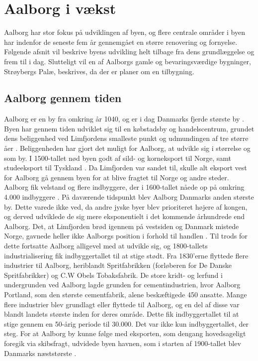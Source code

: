 \chapter{Aalborg i vækst}
Aalborg har stor fokus på udviklingen af byen, og flere centrale områder i byen har indenfor de seneste fem år gennemgået en større renovering og fornyelse. Følgende afsnit vil beskrive byens udvikling helt tilbage fra dens grundlæggelse og frem til i dag. Slutteligt vil en af Aalborgs gamle og bevaringsværdige bygninger, Strøybergs Palæ, beskrives, da der er planer om en tilbygning. 

\section{Aalborg gennem tiden}
Aalborg er en by fra omkring år 1040, og er i dag Danmarks fjerde største by \citep{Denstore}. Byen har gennem tiden udviklet sig til en købstadsby og handelscentrum, grundet dens beliggenhed ved Limfjordens smalleste punkt og udmundingen af tre større åer \citep{byhistorie}. Beliggenheden har gjort det muligt for Aalborg, at udvikle sig i størrelse og som by. I 1500-tallet nød byen godt af sild- og korneksport til Norge, samt studeeksport til Tyskland \citep{byhistorie}. Da Limfjorden var sandet til, skulle alt eksport vest for Aalborg gå gennem byen for at blive fragtet til Norge og andre steder. Aalborg fik velstand og flere indbyggere, der i 1600-tallet nåede op på omkring 4.000 indbyggere \citep{indbyggertal}. På daværende tidspunkt blev Aalborg Danmarks anden største by. Dette varede ikke ved, da andre jyske byer blev prioriteret højere af kongen, og derved udviklede de sig mere eksponentielt i det kommende århundrede end Aalborg. Det, at Limfjorden brød igennem på vestsiden og Danmark mistede Norge, gavnede heller ikke Aalborgs position i forhold til handlen \citep{indbyggertal}.
\newline \indent{     }  Til trods for dette fortsatte Aalborg alligevel med at udvikle sig, og 1800-tallets industrialisering fik indbyggertallet til at stige stødt. Fra 1830’erne flyttede flere industrier til Aalborg, heriblandt Spritfabrikken (forløberen for De Danske Spritfabrikker) og C.W Obels Tobaksfabrik. 
\newline \indent{     }  De store kridt- og lerfund i undergrunden ved Aalborg lagde grunden for cementindustrien, hvor Aalborg Portland, som den største cementfabrik, alene beskæftigede 450 ansatte. Mange flere industrier blev grundlagt eller flyttede til Aalborg, og en del af disse var blandt landets største inden for deres område. Dette fik indbyggertallet til at stige gennem en 50-årig periode til 30.000. Det var ikke kun indbyggertallet, der steg. For at Aalborg by kunne følge med eksporten, som dengang hovedsageligt foregik via skibsfragt, udvidede byen havnen, som i starten af 1900-tallet blev Danmarks næststørste \citep{byhistorie}.
